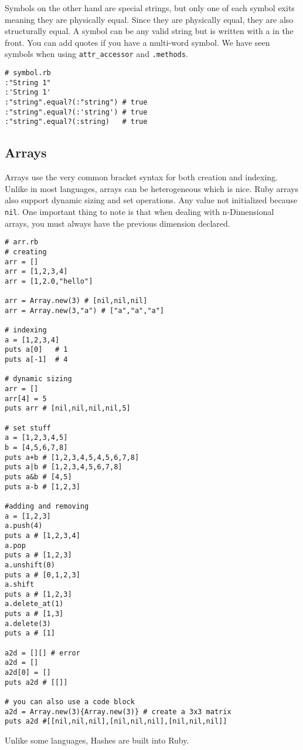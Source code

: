 \documentclass[main.tex]{subfiles}
\begin{document}
Symbols on the other hand are special strings, but only one of each symbol exits meaning they are physically equal. 
Since they are physically equal, they are also structurally equal. 
A symbol can be any valid string but is written with a \cout{:} in the front. 
You can add quotes if you have a multi-word symbol.
We have seen symbols when using \texttt{attr\_accessor} and \texttt{.methods}.

\begin{lstlisting}[style=MyRubyStyle]
# symbol.rb
:"String 1"
:'String 1'
:"string".equal?(:"string") # true
:"string".equal?(:'string') # true
:"string".equal?(:string)   # true
\end{lstlisting}

\subsection{Arrays}
Arrays use the very common bracket syntax for both creation and indexing.
Unlike in most languages, arrays can be heterogeneous which is nice.
Ruby arrays also support dynamic sizing and set operations.
Any value not initialized because \texttt{nil}.
One important thing to note is that when dealing with n-Dimensional arrays, you must always have the previous dimension declared.
\begin{lstlisting}[style=MyRubyStyle]
# arr.rb
# creating
arr = []
arr = [1,2,3,4]
arr = [1,2.0,"hello"]

arr = Array.new(3) # [nil,nil,nil]
arr = Array.new(3,"a") # ["a","a","a"]

# indexing
a = [1,2,3,4]
puts a[0]   # 1
puts a[-1]  # 4

# dynamic sizing
arr = []
arr[4] = 5
puts arr # [nil,nil,nil,nil,5]

# set stuff
a = [1,2,3,4,5]
b = [4,5,6,7,8]
puts a+b # [1,2,3,4,5,4,5,6,7,8]
puts a|b # [1,2,3,4,5,6,7,8]
puts a&b # [4,5]
puts a-b # [1,2,3]

#adding and removing
a = [1,2,3]
a.push(4)
puts a # [1,2,3,4]
a.pop
puts a # [1,2,3]
a.unshift(0)
puts a # [0,1,2,3]
a.shift
puts a # [1,2,3]
a.delete_at(1)
puts a # [1,3]
a.delete(3)
puts a # [1]

a2d = [][] # error
a2d = []
a2d[0] = []
puts a2d # [[]]

# you can also use a code block
a2d = Array.new(3){Array.new(3)} # create a 3x3 matrix 
puts a2d #[[nil,nil,nil],[nil,nil,nil],[nil,nil,nil]]

\end{lstlisting}
Unlike some languages, Hashes are built into Ruby. 
\end{document}
